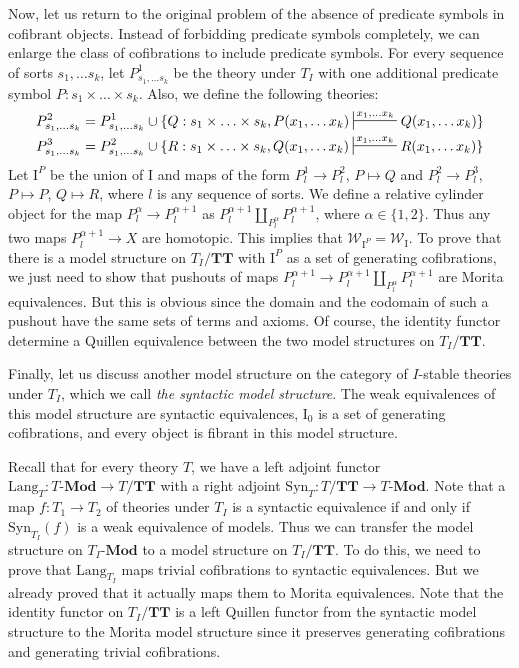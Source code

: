 \documentclass[reqno]{amsart}
\theoremstyle{definition}
\theoremstyle{remark}
\newcommand{\cat}[1]{\mathbf{#1}}
\newcommand{\Mod}[1]{#1\text{-}\cat{Mod}}
\newcommand{\algtt}{\cat{TT}}
\newcommand{\Syn}{\mathrm{Syn}}
\newcommand{\Lang}{\mathrm{Lang}}
\newcommand{\we}{\mathcal{W}}
\newcommand{\I}{\mathrm{I}}
\numberwithin{figure}{section}
\begin{document}
Now, let us return to the original problem of the absence of predicate symbols in cofibrant objects.
Instead of forbidding predicate symbols completely, we can enlarge the class of cofibrations to include predicate symbols.
For every sequence of sorts $s_1, \ldots s_k$, let $P^1_{s_1, \ldots s_k}$ be the theory under $T_I$ with one additional predicate symbol $P : s_1 \times \ldots \times s_k$.
Also, we define the following theories:
\begin{align*}
P^2_{s_1, \ldots s_k} & = P^1_{s_1, \ldots s_k} \cup \{ Q : s_1 \times \ldots \times s_k, P(x_1, \ldots x_k) \sststile{}{x_1, \ldots x_k} Q(x_1, \ldots x_k) \} \\
P^3_{s_1, \ldots s_k} & = P^2_{s_1, \ldots s_k} \cup \{ R : s_1 \times \ldots \times s_k, Q(x_1, \ldots x_k) \sststile{}{x_1, \ldots x_k} R(x_1, \ldots x_k) \}
\end{align*}
Let $\I^P$ be the union of $\I$ and maps of the form $P^1_l \to P^2_l$, $P \mapsto Q$ and $P^2_l \to P^3_l$, $P \mapsto P$, $Q \mapsto R$, where $l$ is any sequence of sorts.
We define a relative cylinder object for the map $P^\alpha_l \to P^{\alpha+1}_l$ as $P^{\alpha+1}_l \amalg_{P^\alpha_l} P^{\alpha+1}_l$, where $\alpha \in \{ 1, 2\}$.
Thus any two maps $P^{\alpha+1}_l \to X$ are homotopic.
This implies that $\we_{\I^P} = \we_\I$.
To prove that there is a model structure on $T_I/\algtt$ with $\I^P$ as a set of generating cofibrations,
we just need to show that pushouts of maps $P^{\alpha+1}_l \to P^{\alpha+1}_l \amalg_{P^\alpha_l} P^{\alpha+1}_l$ are Morita equivalences.
But this is obvious since the domain and the codomain of such a pushout have the same sets of terms and axioms.
Of course, the identity functor determine a Quillen equivalence between the two model structures on $T_I/\algtt$.

Finally, let us discuss another model structure on the category of $I$-stable theories under $T_I$, which we call \emph{the syntactic model structure}.
The weak equivalences of this model structure are syntactic equivalences, $\I_0$ is a set of generating cofibrations, and every object is fibrant in this model structure.

Recall that for every theory $T$, we have a left adjoint functor $\Lang_T : \Mod{T} \to T/\algtt$ with a right adjoint $\Syn_T : T/\algtt \to \Mod{T}$.
Note that a map $f : T_1 \to T_2$ of theories under $T_I$ is a syntactic equivalence if and only if $\Syn_{T_I}(f)$ is a weak equivalence of models.
Thus we can transfer the model structure on $\Mod{T_I}$ to a model structure on $T_I/\algtt$.
To do this, we need to prove that $\Lang_{T_I}$ maps trivial cofibrations to syntactic equivalences.
But we already proved that it actually maps them to Morita equivalences.
Note that the identity functor on $T_I/\algtt$ is a left Quillen functor from the syntactic model structure to the Morita model structure
since it preserves generating cofibrations and generating trivial cofibrations.
\end{document}
